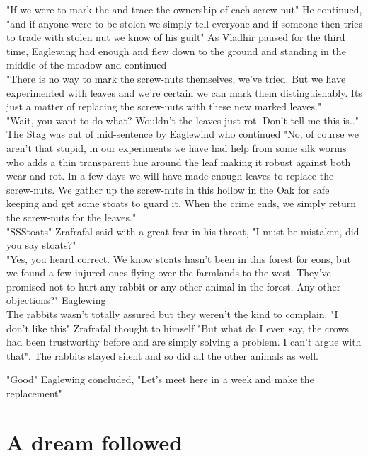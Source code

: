 \documentclass[smalldemyvopaper,11pt,twoside,onecolumn,openright,extrafontsizes]{memoir}
\begin{document}
"If we were to mark the and trace the ownership of each screw-nut" He continued, "and if anyone were to be stolen we simply tell everyone and if someone then tries to trade with stolen nut we know of his guilt" As Vladhir paused for the third time, Eaglewing had enough and flew down to the ground and standing in the middle of the meadow and continued \\

"There is no way to mark the screw-nuts themselves, we've tried. But we have experimented with leaves and we're certain we can mark them distinguishably. Its just a matter of replacing the screw-nuts with these new marked leaves."\\

"Wait, you want to do what? Wouldn't the leaves just rot. Don't tell me this is.." The Stag was cut of mid-sentence by Eaglewind who continued
"No, of course we aren't that stupid, in our experiments we have had help from some silk worms who adds a thin transparent hue around the leaf making it robust against both wear and rot. In a few days we will have made enough leaves to replace the screw-nuts. We gather up the screw-nuts in this hollow in the Oak for safe keeping and get some stoats to guard it. When the crime ends, we simply return the screw-nuts for the leaves."\\

"SSStoats" Zrafrafal said with a great fear in his throat, "I must be mistaken, did you say stoats?"\\

"Yes, you heard correct. We know stoats hasn't been in this forest for eons, but we found a few injured ones flying over the farmlands to the west. They've promised not to hurt any rabbit or any other animal in the forest. Any other objections?" Eaglewing  \\

The rabbits wasn't totally assured but they weren't the kind to complain. "I don't like this" Zrafrafal thought to himself "But what do I even say, the crows had been trustworthy before and are simply solving a problem. I can't argue with that". The rabbits stayed silent and so did all the other animals as well.

"Good" Eaglewing concluded, "Let's meet here in a week and make the replacement"


\chapter{A dream followed}
\end{document}
